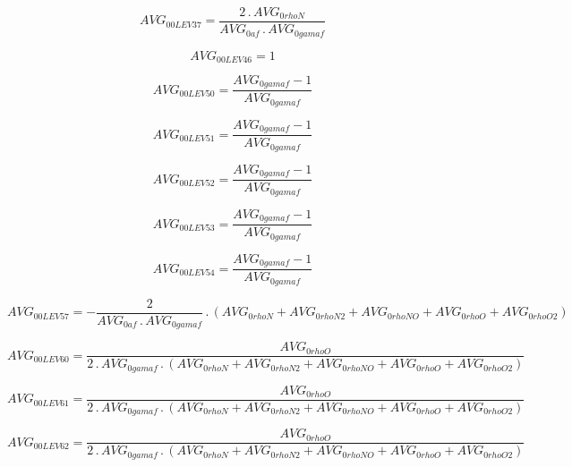 \documentclass{article}
\begin{document}
\begin{dmath}AVG_{0 0 LEV 37} = \frac{2 \,.\, AVG_{0 rhoN}}{AVG_{0 af} \,.\, AVG_{0 gamaf}}\end{dmath}

\begin{dmath}AVG_{0 0 LEV 46} = 1\end{dmath}

\begin{dmath}AVG_{0 0 LEV 50} = \frac{AVG_{0 gamaf} - 1}{AVG_{0 gamaf}}\end{dmath}

\begin{dmath}AVG_{0 0 LEV 51} = \frac{AVG_{0 gamaf} - 1}{AVG_{0 gamaf}}\end{dmath}

\begin{dmath}AVG_{0 0 LEV 52} = \frac{AVG_{0 gamaf} - 1}{AVG_{0 gamaf}}\end{dmath}

\begin{dmath}AVG_{0 0 LEV 53} = \frac{AVG_{0 gamaf} - 1}{AVG_{0 gamaf}}\end{dmath}

\begin{dmath}AVG_{0 0 LEV 54} = \frac{AVG_{0 gamaf} - 1}{AVG_{0 gamaf}}\end{dmath}

\begin{dmath}AVG_{0 0 LEV 57} = - \frac{2}{AVG_{0 af} \,.\, AVG_{0 gamaf}} \,.\, \left(AVG_{0 rhoN} + AVG_{0 rhoN2} + AVG_{0 rhoNO} + AVG_{0 rhoO} + AVG_{0 rhoO2}\right)\end{dmath}

\begin{dmath}AVG_{0 0 LEV 60} = \frac{AVG_{0 rhoO}}{2 \,.\, AVG_{0 gamaf} \,.\, \left(AVG_{0 rhoN} + AVG_{0 rhoN2} + AVG_{0 rhoNO} + AVG_{0 rhoO} + AVG_{0 rhoO2}\right)}\end{dmath}

\begin{dmath}AVG_{0 0 LEV 61} = \frac{AVG_{0 rhoO}}{2 \,.\, AVG_{0 gamaf} \,.\, \left(AVG_{0 rhoN} + AVG_{0 rhoN2} + AVG_{0 rhoNO} + AVG_{0 rhoO} + AVG_{0 rhoO2}\right)}\end{dmath}

\begin{dmath}AVG_{0 0 LEV 62} = \frac{AVG_{0 rhoO}}{2 \,.\, AVG_{0 gamaf} \,.\, \left(AVG_{0 rhoN} + AVG_{0 rhoN2} + AVG_{0 rhoNO} + AVG_{0 rhoO} + AVG_{0 rhoO2}\right)}\end{dmath}
\end{document}
